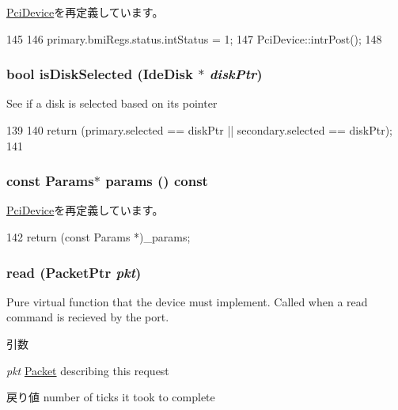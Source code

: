 \hyperlink{classPciDevice_aba6fa755ca152cedafeb4150da6a2493}{PciDevice}を再定義しています。


\begin{DoxyCode}
145 {
146     primary.bmiRegs.status.intStatus = 1;
147     PciDevice::intrPost();
148 }
\end{DoxyCode}
\hypertarget{classIdeController_ab16ba5b7c8f5e314b4003eb4bf9d40bf}{
\subsubsection[{isDiskSelected}]{\setlength{\rightskip}{0pt plus 5cm}bool isDiskSelected ({\bf IdeDisk} $\ast$ {\em diskPtr})}}
\label{classIdeController_ab16ba5b7c8f5e314b4003eb4bf9d40bf}
See if a disk is selected based on its pointer 


\begin{DoxyCode}
139 {
140     return (primary.selected == diskPtr || secondary.selected == diskPtr);
141 }
\end{DoxyCode}
\hypertarget{classIdeController_acd3c3feb78ae7a8f88fe0f110a718dff}{
\subsubsection[{params}]{\setlength{\rightskip}{0pt plus 5cm}const {\bf Params}$\ast$ params () const}}
\label{classIdeController_acd3c3feb78ae7a8f88fe0f110a718dff}


\hyperlink{classPciDevice_acd3c3feb78ae7a8f88fe0f110a718dff}{PciDevice}を再定義しています。


\begin{DoxyCode}
142 { return (const Params *)_params; }
\end{DoxyCode}
\hypertarget{classIdeController_a613ec7d5e1ec64f8d21fec78ae8e568e}{
\subsubsection[{read}]{ read ({\bf PacketPtr} {\em pkt})}}
\label{classIdeController_a613ec7d5e1ec64f8d21fec78ae8e568e}
Pure virtual function that the device must implement. Called when a read command is recieved by the port. 
\begin{DoxyParams}{引数}
\item[{\em pkt}]\hyperlink{classPacket}{Packet} describing this request \end{DoxyParams}
\begin{DoxyReturn}{戻り値}
number of ticks it took to complete 
\end{DoxyReturn}


